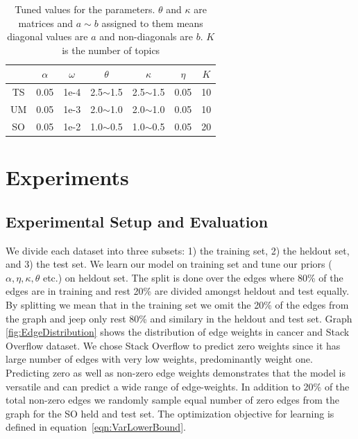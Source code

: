 \documentclass{sig-alternate}
\begin{document}
\begin{table}
\begin{center}
\begin{tabular}{c|c|c|c|c|c|c|}
 & $\alpha$ & $\omega$ & $\theta$ & $\kappa$ & $\eta$ & $K$\\\hline
 TS & 0.05 & 1e-4 & 2.5$\sim$1.5 & 2.5$\sim$1.5& 0.05 & 10\\\hline
 UM & 0.05 & 1e-3 & 2.0$\sim$1.0 & 2.0$\sim$1.0 & 0.05 & 10\\\hline
 SO & 0.05 & 1e-2 & 1.0$\sim$0.5 & 1.0$\sim$0.5 & 0.05 & 20\\\hline
\end{tabular}
\label{tab:tunedParameters}
\end{center}
\caption{Tuned values for the parameters. $\theta$ and $\kappa$ are matrices
and $a\sim b$ assigned to them means diagonal values are $a$ and non-diagonals
are $b$. $K$ is the number of topics}
\end{table}

\section{Experiments}

\subsection{Experimental Setup and Evaluation}
\label{sec:setup}
We divide each dataset into three subsets: 1) the training set, 2) the heldout set,
and 3) the test set. We learn our model on training set and tune our priors 
($\alpha, \eta, \kappa, \theta$ etc.) on heldout set. The split is done over the
edges where 80\% of the edges are in training and rest 20\% are divided amongst
heldout and test equally. By splitting we mean that in the training set we
omit the 20\% of the edges from the graph and jeep only rest 80\% and similary 
in the heldout and test set. 
Graph \ref{fig:EdgeDistribution} shows the distribution of edge weights in
cancer and Stack Overflow dataset. We chose Stack Overflow to predict
zero weights since it has large number of edges with very low weights,
predominantly weight one. Predicting zero as well as non-zero edge weights
demonstrates that the model is versatile and can predict a wide range of 
edge-weights. In addition to 20\% of the total
non-zero edges we randomly sample equal number of zero edges from the graph for
the SO held and test set.
The optimization objective for learning is defined in
equation~\ref{eqn:VarLowerBound}.
\end{document}
